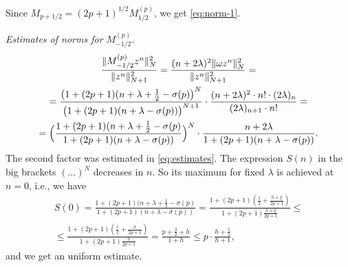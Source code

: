 \documentclass[]{amsart}
\newcounter{sec}
\def\le{\leqslant}
\def\sm{\smallskip}
\begin{document}

Since $M_{p+1/2}=(2p+1)^{1/2} M^{(p)}_{1/2}$, we get \eqref{eq:norm-1}.

\sm

{\it Estimates of norms for
 $M_{-1/2}^{(p)}$.}
\begin{multline*}
  \frac {\|M_{-1/2}^{(p)} z^n\|_N^2} {\|z^n\|_{N+1}^2}=  \frac {(n+2\lambda)^2\|\omega z^n\|_N^2} {\|z^n\|_{N+1}^2}
  =\\=
    \frac{\bigl(1+(2p+1)(n+\lambda+\frac12 -\sigma(p)\bigr)^N}
 {\bigl(1+(2p+1)(n+\lambda- \sigma(p))\bigr)^{N+1}}
 \cdot \frac{(n+2\lambda)^2\cdot n! \cdot (2\lambda)_{n}}
 {(2\lambda)_{n+1}\cdot n!}
   =\\= 
   \Bigl(\frac{1+(2p+1)(n+\lambda+\frac12 -\sigma(p)}
 {1+(2p+1)(n+\lambda- \sigma(p))}\Bigr)^N
\cdot
 \frac{n+2\lambda}{{1+(2p+1)(n+\lambda- \sigma(p))} }.
\end{multline*}
The second factor was estimated in \eqref{eq:estimates}.
 The expression $S(n)$ in the big brackets $(\dots)^{N}$ decreases in $n$. So its maximum for fixed $\lambda$ is achieved 
at $n=0$, i.e., we have 
\begin{multline}
S(0)=
\frac{1+(2p+1)(n+\lambda+\frac12 -\sigma(p)}
 {1+(2p+1)(n+\lambda- \sigma(p))}
=
\frac{1+(2p+1)(\frac12 +\frac{h+\xi}{2p+1})}
 {1+(2p+1)\frac{h+\xi}{2p+1}} 
 \le \\\le
\frac{1+(2p+1)(\frac12 +\frac{h}{2p+1})}
 {1+(2p+1)\frac{h}{2p+1}} 
 =\frac{p+\frac32+h}{1+h}\le p\cdot \frac{h+\frac52}{h+1}, 
 \label{eq:estimates2}
\end{multline}
and we get an uniform estimate.
\end{document}
